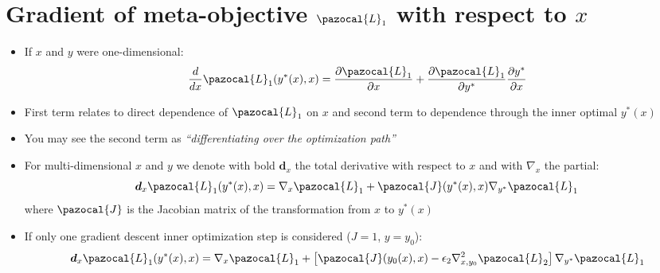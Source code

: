 \section{Gradient of meta-objective $\pazocal{L}_1$ with respect to $x$}
\begin{itemize}
	\item If $x$ and $y$ were one-dimensional:
	\begin{equation}
		\frac{d}{dx}\pazocal{L}_1(y^*(x), x) = \frac{\partial \pazocal{L}_1}{\partial x} + \frac{\partial \pazocal{L}_1}{\partial y^*} \frac{\partial y^*}{\partial x} 
	\end{equation}
	\item First term relates to direct dependence of $\pazocal{L}_1$ on $x$ and second term to dependence through the inner optimal $y^*(x)$
	\item You may see the second term as \textit{``differentiating over the optimization path''}
	\item For multi-dimensional $x$ and $y$ we denote with bold $\boldsymbol{d}_x$ the total derivative with respect to $x$ and with $\nabla_x$ the partial:
	\begin{equation}\label{eq:many:steps:derivative}
		\boldsymbol{d}_x\pazocal{L}_1(y^*(x), x) = \nabla_x \pazocal{L}_1 + \pazocal{J}(y^*(x), x) \nabla_{y^*}\pazocal{L}_1 
	\end{equation}
	where $\pazocal{J}$ is the Jacobian matrix of the transformation from $x$ to $y^*(x)$
	\item If only one gradient descent inner optimization step is considered ($J = 1$, $y=y_0$):
	\begin{equation}\label{eq:one:step:derivative}
		\boldsymbol{d}_x\pazocal{L}_1(y^*(x), x) = \nabla_x \pazocal{L}_1 + \left[\pazocal{J}(y_0(x), x) - \epsilon_2 \nabla_{x,y_0}^2\pazocal{L}_2\right]\nabla_{y^*}\pazocal{L}_1 
	\end{equation}	
\end{itemize}

